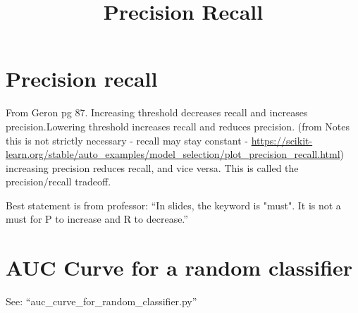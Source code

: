 \documentclass{article}
\begin{document}
\title{Precision Recall}
\section{Precision recall}
From Geron pg 87. Increasing threshold decreases recall and increases precision.Lowering threshold increases recall and reduces precision. (from Notes this is not strictly necessary - recall may stay constant - \url{https://scikit-learn.org/stable/auto_examples/model_selection/plot_precision_recall.html})\\

increasing precision reduces recall, and vice versa. This is called the precision/recall tradeoff.

Best statement is from professor: ``In slides, the keyword is "must". It is not a must for P to increase and R to decrease.''

\section{AUC Curve for a random classifier}
See: ``auc\_curve\_for\_random\_classifier.py''
\end{document}
